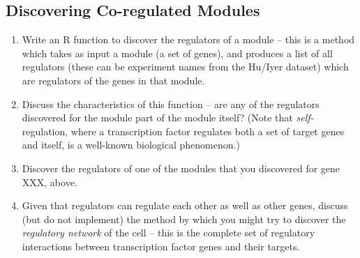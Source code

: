 \documentclass{article}
\begin{document}
\subsection{Discovering Co-regulated Modules}

\begin{enumerate}
\item Write an R function to discover the regulators of a module -- this is a method which takes as input a module (a set of genes), and produces a list of all regulators (these can be experiment names from the Hu/Iyer dataset) which are regulators of the genes in that module.  
\item Discuss the characteristics of this function -- are any of the regulators discovered for the module part of the module itself?  (Note that \emph{self-}regulation, where a transcription factor regulates both a set of target genes and itself, is a well-known biological phenomenon.)  
\item Discover the regulators of one of the modules that you discovered for gene XXX, above.   
\item Given that regulators can regulate each other as well as other genes, discuss (but do not implement) the method by which you might try to discover the \emph{regulatory network} of the cell -- this is the complete set of regulatory interactions between transcription factor genes and their targets.  
\end{enumerate}
\end{document}
